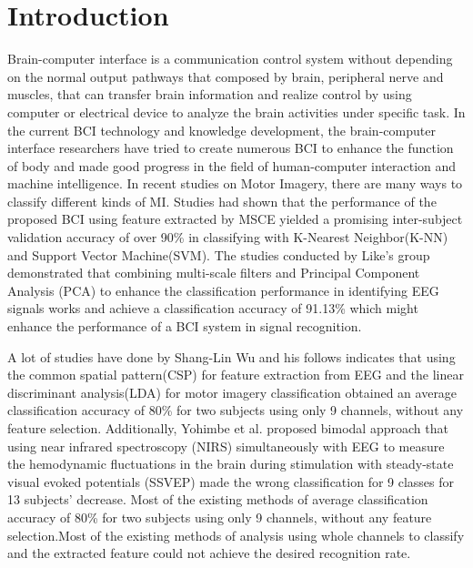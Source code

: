 \documentclass{llncs}
\begin{document}
\section{Introduction}
%
Brain-computer interface is a communication control system without depending on the normal output pathways that composed by brain, peripheral nerve and muscles, that can transfer brain information and realize control by using computer or electrical device to analyze the brain activities under specific task\cite{1}. In the current BCI technology and knowledge development, the brain-computer interface researchers have tried to create numerous BCI to enhance the function of body and made good progress in the field of human-computer interaction and machine intelligence. In recent studies on Motor Imagery, there are many ways to classify different kinds of MI\cite{9}. Studies had shown that the performance of the proposed BCI using feature extracted by MSCE yielded a promising inter-subject validation accuracy of over 90\% in classifying  with K-Nearest Neighbor(K-NN) and Support Vector Machine(SVM)\cite{1}. The studies conducted by Like’s group demonstrated that combining multi-scale filters and Principal Component Analysis (PCA) to enhance the classification performance in identifying EEG signals works and achieve a classification accuracy of 91.13\% which might enhance the performance of a BCI system in signal recognition\cite{2}. 


A lot of studies have done by Shang-Lin Wu and his follows indicates that using the common spatial pattern(CSP) for feature extraction from EEG and the linear discriminant analysis(LDA) for motor imagery classification obtained an average classification accuracy of 80\% for two subjects using only 9 channels, without any feature selection\cite{4}. Additionally, Yohimbe et al. proposed bimodal approach that using near infrared spectroscopy (NIRS) simultaneously with EEG to measure the hemodynamic fluctuations in the brain during stimulation with steady-state visual evoked potentials (SSVEP) made the wrong classification for 9 classes for 13 subjects’ decrease\cite{7}. Most of the existing methods of average classification accuracy of 80\% for two subjects using only 9 channels, without any feature selection\cite{4}.Most of the existing methods of analysis using whole channels to classify and the extracted feature could not achieve the desired recognition rate.
\end{document}
